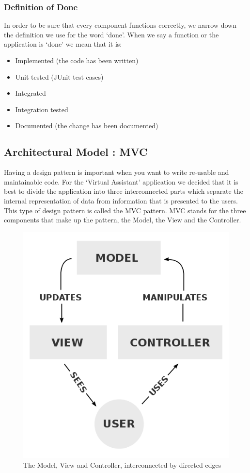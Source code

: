 \subsubsection{Definition of Done} 
In order to be sure that every component functions correctly, we narrow down the definition we use for the word `done'. When we say a function or the application is `done' we mean that it is: 

\begin{itemize}
	\item	Implemented (the code has been written)
	\item	Unit tested (JUnit test cases)
	\item 	Integrated
	\item 	Integration tested
	\item 	Documented (the change has been documented)
\end{itemize} 

\subsection{Architectural Model : MVC}
Having a design pattern is important when you want to write re-usable and maintainable code.
For the `Virtual Assistant' application we decided that it is best to divide the application into three interconnected parts which separate the internal representation of data from information that is presented to the users\cite{wiki:mvc}. This type of design pattern is called the MVC pattern. MVC stands for the three components that make up the pattern, the Model, the View and the Controller.
\begin{figure}[h]
\centering
\includegraphics[scale=0.3]{./img/MVC.png}
\caption{\small{The Model, View and Controller, interconnected by directed edges}}
\label{mvc}
	
\end{figure}

